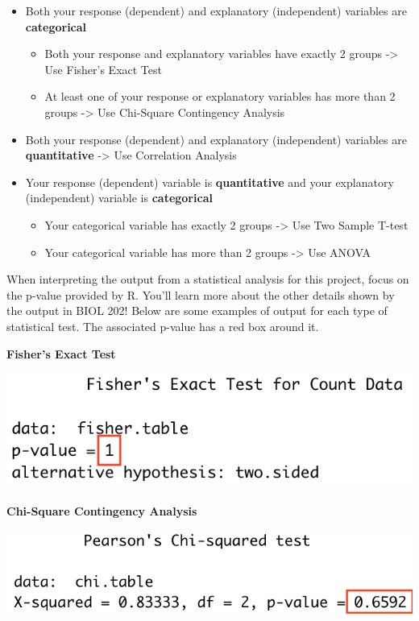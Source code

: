 \documentclass[
]{book}
\providecommand{\tightlist}{%
  \setlength{\itemsep}{0pt}\setlength{\parskip}{0pt}}
\begin{document}
\begin{itemize}
\tightlist
\item
  Both your response (dependent) and explanatory (independent) variables are \textbf{categorical}

  \begin{itemize}
  \tightlist
  \item
    Both your response and explanatory variables have exactly 2 groups -\textgreater{} Use Fisher's Exact Test
  \item
    At least one of your response or explanatory variables has more than 2 groups -\textgreater{} Use Chi-Square Contingency Analysis
  \end{itemize}
\item
  Both your response (dependent) and explanatory (independent) variables are \textbf{quantitative} -\textgreater{} Use Correlation Analysis
\item
  Your response (dependent) variable is \textbf{quantitative} and your explanatory (independent) variable is \textbf{categorical}

  \begin{itemize}
  \tightlist
  \item
    Your categorical variable has exactly 2 groups -\textgreater{} Use Two Sample T-test
  \item
    Your categorical variable has more than 2 groups -\textgreater{} Use ANOVA
  \end{itemize}
\end{itemize}

When interpreting the output from a statistical analysis for this project, focus on the p-value provided by R. You'll learn more about the other details shown by the output in BIOL 202! Below are some examples of output for each type of statistical test. The associated p-value has a red box around it.

\textbf{Fisher's Exact Test}

\includegraphics{images/fishers_example.png}

\textbf{Chi-Square Contingency Analysis}

\includegraphics{images/chi-square_example.png}
\end{document}
